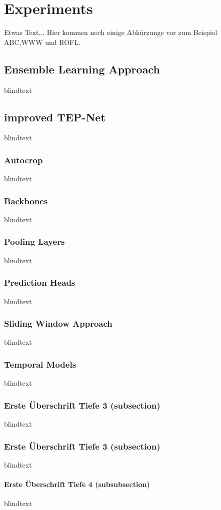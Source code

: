\chapter{Experiments}
\label{sec:experiments}
Etwas Text... Hier kommen noch einige Abkürzunge vor zum Beispiel \ac{ABC},\ac{WWW} und \ac{ROFL}.

\section{Ensemble Learning Approach}
blindtext

\section{improved TEP-Net}
blindtext

\subsection{Autocrop}
blindtext

\subsection{Backbones}
blindtext

\subsection{Pooling Layers}
blindtext

\subsection{Prediction Heads}
blindtext

\subsection{Sliding Window Approach}
blindtext

\subsection{Temporal Models}
blindtext

\subsection{Erste Überschrift Tiefe 3 (subsection)}
blindtext

\subsection{Erste Überschrift Tiefe 3 (subsection)}
blindtext

\subsubsection{Erste Überschrift Tiefe 4 (subsubsection)}
blindtext
